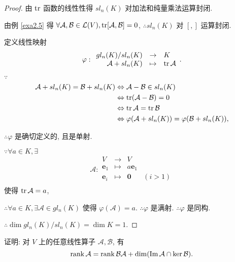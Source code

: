 \documentclass[color=black,device=normal,lang=cn,mode=geye]{elegantnote}
\begin{document}
\begin{proof}
    由 $\operatorname{tr}$ 函数的线性性得 $sl_n(K)$ 对加法和纯量乘法运算封闭.

    由例 \ref{exa2.5} 得 $\forall\mathcal{A},\mathcal{B}\in\mathcal{L}(V),\operatorname{tr}[\mathcal{A},\mathcal{B}]=0$, $\therefore sl_n(K)$ 对 $[,]$ 运算封闭.

    定义线性映射
    \[\varphi:\begin{array}{rcl}
        gl_n(K)/sl_n(K) & \to & K \\
        \mathcal{A}+sl_n(K) & \mapsto & \operatorname{tr}\mathcal{A} \\
    \end{array}.\]

    $\because$
    \begin{align*}
        \mathcal{A}+sl_n(K)=\mathcal{B}+sl_n(K) & \Leftrightarrow\mathcal{A}-\mathcal{B}\in sl_n(K) \\
        & \Leftrightarrow\operatorname{tr}(\mathcal{A}-\mathcal{B})=0 \\
        & \Leftrightarrow\operatorname{tr}\mathcal{A}=\operatorname{tr}\mathcal{B} \\
        & \Leftrightarrow\varphi(\mathcal{A}+sl_n(K))=\varphi(\mathcal{B}+sl_n(K)),
    \end{align*}

    $\therefore\varphi$ 是确切定义的, 且是单射.

    $\because\forall a\in K,\exists$
    \[\mathcal{A}:\begin{array}{rcll}
        V & \to & V \\
        \boldsymbol{e}_1 & \mapsto & a\boldsymbol{e}_1 \\
        \boldsymbol{e}_i & \mapsto & \boldsymbol{0} & (i>1) \\
    \end{array}\]
    使得 $\operatorname{tr}\mathcal{A}=a$,

    $\therefore\forall a\in K,\exists\mathcal{A}\in gl_n(K)$ 使得 $\varphi(\mathcal{A})=a$. $\therefore\varphi$ 是满射. $\therefore\varphi$ 是同构.

    $\therefore\dim gl_n(K)/sl_n(K)=\dim K=1$.
\end{proof}
\begin{exercise}\label{ex2.5}
    证明: 对 $V$ 上的任意线性算子 $\mathcal{A},\mathcal{B}$, 有
    \[\operatorname{rank} \mathcal{A}=\operatorname{rank} \mathcal{BA}+\dim(\operatorname{Im} \mathcal{A}\cap\ker\mathcal{B}).\]
\end{exercise}
\end{document}
